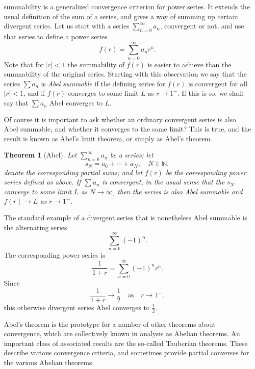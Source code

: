 \documentclass[12pt]{article}
\newcommand{\natnums}{\mathbb{N}}
\newtheorem{theorem}[proposition]{Theorem}
\begin{document}
summability is a generalized convergence criterion for power series.
It extends the usual definition of the sum of a series, and gives a
way of summing up certain divergent series.  Let us start with a
series $\sum_{n=0}^\infty a_n$, convergent or not, and use that series
to define a power series
$$f(r) = \sum_{n=0}^\infty a_n r^n.$$
Note that for $|r|<1$ the
summability of $f(r)$ is easier to achieve than the summability of the
original series.  Starting with this observation we say that the
series $\sum a_n$ is \emph{Abel summable} if the defining series
for $f(r)$ is convergent for all $|r|<1$, and if $f(r)$ converges to
some limit $L$ as $r\rightarrow 1^-$.  If this is so, we shall say
that $\sum a_n$ Abel converges to $L$.

Of course it is important to ask whether an ordinary convergent series
is also Abel summable, and whether it converges to the same limit?
This is true, and the result is known as Abel's limit theorem,
or simply as Abel's theorem.
\begin{theorem}[Abel]
  Let $\sum_{n=0}^\infty a_n$ be a series; let 
  $$s_N=a_0+\cdots+a_N,\quad N\in\natnums,$$
  denote the corresponding
  partial sums; and let $f(r)$ be the corresponding power series
  defined as above.  If $\sum a_n$ is convergent, in the
  usual sense that the $s_N$ converge to some limit $L$ as
  $N\rightarrow\infty$, then the series is also Abel summable and
  $f(r)\rightarrow L$ as $r\rightarrow 1^-$.
\end{theorem}

The standard example of a divergent series that is nonetheless Abel
summable is the alternating series
$$\sum_{n=0}^\infty (-1)^n.$$
The corresponding power series is
$$\frac{1}{1+r}=\sum_{n=0}^\infty (-1)^n r^n.$$
Since 
$$\frac{1}{1+r}\rightarrow \frac{1}{2}\quad \text{as}\quad
r\rightarrow 1^-,$$
this otherwise divergent series Abel converges to $\frac{1}{2}$.

Abel's theorem is the prototype for a number of other theorems about
convergence, which are collectively known in analysis as Abelian
theorems.  An important class of associated results are the so-called
Tauberian theorems.  These describe various convergence criteria, and
sometimes provide partial converses for the various Abelian theorems.
\end{document}
